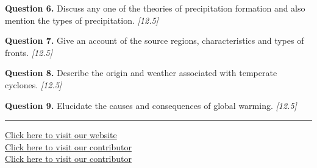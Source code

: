 \documentclass[11pt,a4paper]{article}
\newcommand{\pts}[1]{\hfill   \textit{[#1]}}
\begin{document}
\noindent   \textbf{Question 6.} Discuss any one of the theories of precipitation formation and also mention the types of precipitation. \pts{12.5}

\medskip


\noindent   \textbf{Question 7.} Give an account of the source regions, characteristics and types of fronts. \pts{12.5}

\medskip


\noindent   \textbf{Question 8.} Describe the origin and weather associated with temperate cyclones. \pts{12.5}

\medskip


\noindent   \textbf{Question 9.} Elucidate the causes and consequences of global warming. \pts{12.5}

\vfill\rule{\linewidth}{0.4pt}

\begin{center}\small
\href{https://bhu-exam.vercel.app/}{Click here to visit our website}\\[4pt]
\href{https://me-aryan.vercel.app/}{Click here to visit our contributor}\\[4pt]
\href{https://quashan-me.vercel.app/}{Click here to visit our contributor}
\end{center}
\end{document}
